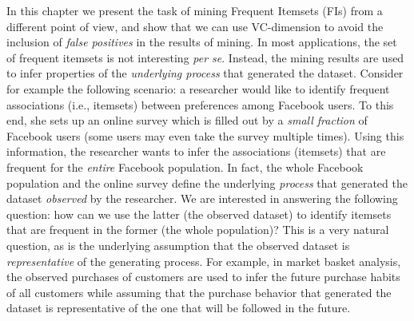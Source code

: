 
In this chapter we present the task of mining Frequent Itemsets (FIs) from a
different point of view, and show that we can use VC-dimension to avoid the
inclusion of \emph{false positives} in the results of mining. In most
applications, the set of frequent itemsets is not interesting \emph{per
se}. %
Instead, the mining results %
are used to infer properties of the \emph{underlying process} that generated the
dataset. Consider for example the following scenario: a researcher would like %
to identify frequent associations (i.e., itemsets) between preferences among
Facebook users. To this end, she sets up an online survey %
which is filled out by a \emph{small fraction} of Facebook users (some users may even
take the survey multiple times). Using this information, the researcher wants to
infer the associations (itemsets) that are frequent for the \emph{entire} Facebook
population. In fact, the %
 whole Facebook population and the online survey define the underlying \emph{process} that
generated the dataset \emph{observed} by the researcher. We are
interested in answering the following question: %
how can we use the latter (the observed dataset) to identify itemsets that are
frequent in the former (the whole population)?
This is a very natural question, as is the underlying assumption that the
observed dataset is \emph{representative} of the generating process. For
example, in market basket analysis, 
the observed purchases of customers are used to infer the future
purchase habits %
of all customers while assuming that %
the purchase behavior that generated the dataset is representative of the one
that will be followed in the future.

